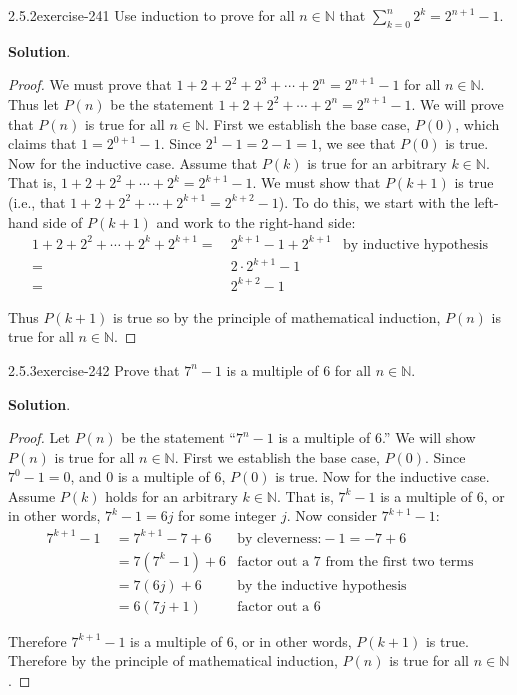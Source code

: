 \documentclass[twoside,11pt,]{book}
\numberwithin{equation}{chapter}
\renewcommand{\d}{\displaystyle}
\newcommand{\N}{\mathbb N}
\newcommand{\amp}{&}
\begin{document}
\begin{divisionsolution}{2.5.2}{}{exercise-241}%
\hypertarget{p-3586}{}%
Use induction to prove for all \(n \in \N\) that \(\d\sum_{k=0}^n 2^k = 2^{n+1} - 1\).%
\par\smallskip%
\noindent\textbf{Solution}.\quad%
\begin{proof}{}
\hypertarget{p-3587}{}%
We must prove that \(1 + 2 + 2^2 + 2^3 + \cdots +2^n = 2^{n+1} - 1\) for all \(n \in \N\). Thus let \(P(n)\) be the statement \(1 + 2 + 2^2 + \cdots + 2^n = 2^{n+1} - 1\). We will prove that \(P(n)\) is true for all \(n \in \N\). First we establish the base case, \(P(0)\), which claims that \(1 = 2^{0+1} -1\). Since \(2^1 - 1 = 2 - 1 = 1\), we see that \(P(0)\) is true. Now for the inductive case. Assume that \(P(k)\) is true for an arbitrary \(k \in \N\). That is, \(1 + 2 + 2^2 + \cdots + 2^k = 2^{k+1} - 1\). We must show that \(P(k+1)\) is true (i.e., that \(1 + 2 + 2^2 + \cdots + 2^{k+1} = 2^{k+2} - 1\)). To do this, we start with the left-hand side of \(P(k+1)\) and work to the right-hand side:%
\begin{align*}
1 + 2 + 2^2 + \cdots + 2^k + 2^{k+1} = \amp ~ 2^{k+1} - 1 + 2^{k+1} \amp \text{by inductive hypothesis}\\
= \amp ~2\cdot 2^{k+1} - 1 \amp\\
= \amp ~ 2^{k+2} - 1 \amp
\end{align*}
%
\par
\hypertarget{p-3588}{}%
Thus \(P(k+1)\) is true so by the principle of mathematical induction, \(P(n)\) is true for all \(n \in \N\).%
\end{proof}
\end{divisionsolution}%
\begin{divisionsolution}{2.5.3}{}{exercise-242}%
\hypertarget{p-3589}{}%
Prove that \(7^n - 1\) is a multiple of 6 for all \(n \in \N\).%
\par\smallskip%
\noindent\textbf{Solution}.\quad%
\begin{proof}{}
\hypertarget{p-3590}{}%
Let \(P(n)\) be the statement ``\(7^n - 1\) is a multiple of 6.'' We will show \(P(n)\) is true for all \(n \in \N\). First we establish the base case, \(P(0)\). Since \(7^0 - 1 = 0\), and \(0\) is a multiple of 6, \(P(0)\) is true. Now for the inductive case. Assume \(P(k)\) holds for an arbitrary \(k \in \N\). That is, \(7^k - 1\) is a multiple of 6, or in other words, \(7^k - 1 = 6j\) for some integer \(j\). Now consider \(7^{k+1} - 1\):%
\begin{align*}
7^{k+1} - 1 ~ \amp = 7^{k+1} - 7 + 6 \amp \text{by cleverness:} -1 = -7 + 6\\
\amp = 7(7^k - 1) + 6 \amp \text{factor out a 7 from the first two terms}\\
\amp = 7(6j) + 6 \amp \text{by the inductive hypothesis}\\
\amp = 6(7j + 1) \amp \text{factor out a 6}
\end{align*}
%
\par
\hypertarget{p-3591}{}%
Therefore \(7^{k+1} - 1\) is a multiple of 6, or in other words, \(P(k+1)\) is true. Therefore by the principle of mathematical induction, \(P(n)\) is true for all \(n \in \N\).%
\end{proof}
\end{divisionsolution}%
\end{document}
